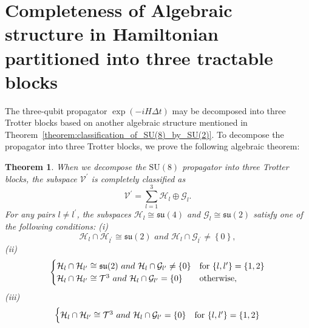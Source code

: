 \documentclass[aps,showpacs,amsmath,amssymb,twocolumn,prx,longbibliography,superscriptaddress,notitlepage,floatfix,10pt]{revtex4-2}
\newtheorem{theorem}{Theorem} %
\begin{document}
\section{Completeness of Algebraic structure in Hamiltonian partitioned into three tractable blocks\label{appendix:Theorem_complete}}


The three-qubit propagator $\exp(-iH \Delta t)$ may be decomposed into three Trotter blocks based on another algebraic structure mentioned in Theorem~\ref{theorem:classification_of_SU(8)_by_SU(2)}.
To decompose the propagator into three Trotter blocks, we prove the following algebraic theorem:

\begin{theorem}
 When we decompose the $\mathrm{SU}(8)$ propagator into three Trotter blocks, the subspace $\mathcal{V}^{\prime}$ is completely classified as
 \begin{equation}
\mathcal{V}^{\prime}=\sum_{l=1}^{3}\mathcal{H}_{l}\oplus\mathcal{G}_{l}.\label{eq:Omega'}
 \end{equation}
For any pairs  $l\not=l^{\prime}$, the subspaces $\mathcal{H}_{l}\cong\mathfrak{su}(4)$ and $\mathcal{G}_{l}\cong\mathfrak{su}(2)$ satisfy one of the following conditions:\newline
 (i) 
 \begin{equation}
     \mathcal{H}_{l}\cap\mathcal{H}_{l^{\prime}}\cong\mathfrak{su}(2)\,\, and\,\,
     \mathcal{H}_{l}\cap\mathcal{G}_{l^{\prime}}\not=\left\{0\right\}\label{eq:cond1_HG},
 \end{equation}
  (ii)
 \begin{equation}
     \begin{cases}
         \mathcal{H}_{l}\cap\mathcal{H}_{l^{\prime}}\cong\mathfrak{su}(2)\,\, and \,\,\mathcal{H}_{l}\cap\mathcal{G}_{l^{\prime}}\not=\left\{0\right\}&{\rm for\,\,}\{l,l^{\prime}\}=\{1,2\}\\
     \mathcal{H}_{l}\cap\mathcal{H}_{l^{\prime}}\cong \mathcal{T}^{3}\,\, and \,\,  \mathcal{H}_{l}\cap\mathcal{G}_{l^{\prime}}=\left\{0\right\}& {\rm otherwise},
     \end{cases}
     \label{eq:cond2HG}
 \end{equation}
 (iii)
 \begin{equation}
     \begin{cases}
         \mathcal{H}_{l}\cap\mathcal{H}_{l^{\prime}}\cong \mathcal{T}^{3}\,\, and \,\,\mathcal{H}_{l}\cap\mathcal{G}_{l^{\prime}}=\left\{0\right\}&{\rm for\,\,}\{l,l^{\prime}\}=\{1,2\}\\

\end{cases}
\end{equation}
\end{theorem}
\end{document}
